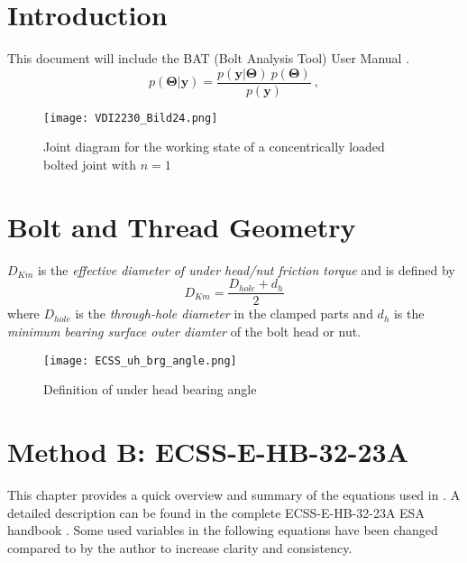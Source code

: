 \chapter{Introduction}
This document will include the BAT (Bolt Analysis Tool) User Manual \cite{ESAPSS} \cite{ECSS_HB_32_23A} \cite{VDI2230_1}.
\begin{equation}
  p(\bm{\Theta}|\bm{y}) = \frac{p(\bm{y}|\bm{\Theta})\ p(\bm{\Theta})}{p(\bm{y})}\ ,
\end{equation}

\begin{figure}[!htpb]
  \centering
  \texttt{[image: VDI2230\_Bild24.png]}
  \caption{Joint diagram for the working state of a concentrically loaded \\ bolted joint with $n=1$ \cite{VDI2230_1}}
  \label{fig:joint_diagram}
\end{figure}

\chapter{Bolt and Thread Geometry}
$D_{Km}$ is the \emph{effective diameter of under head/nut friction torque} and is defined by 
\begin{equation}
  D_{Km} = \frac{D_{hole}+d_h}{2}
  \label{equ:dkm}
\end{equation}
where $D_{hole}$ is the \emph{through-hole diameter} in the clamped parts and $d_h$ is the 
\emph{minimum bearing surface outer diamter} of the bolt head or nut.
\begin{figure}[!htpb]
  \centering
  \texttt{[image: ECSS\_uh\_brg\_angle.png]}
  \caption{Definition of under head bearing angle \cite{ECSS_HB_32_23A}}
  \label{fig:ecss_uh_brg_angle}
\end{figure}

\chapter{Method B: ECSS-E-HB-32-23A}
This chapter provides a quick overview and summary of the equations used in \bat. A detailed description
can be found in the complete ECSS-E-HB-32-23A ESA handbook \cite{ECSS_HB_32_23A}. Some used variables
in the following equations have been changed compared to \cite{ECSS_HB_32_23A} by the author to increase
clarity and consistency.
